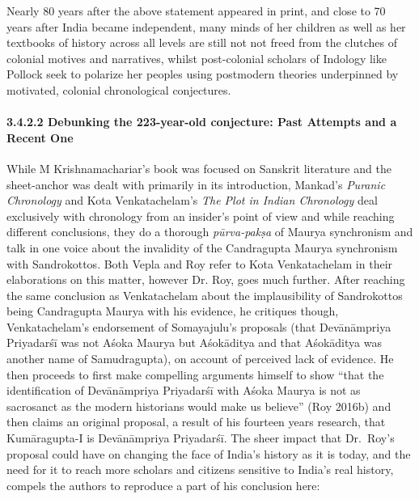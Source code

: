 Nearly 80 years after the above statement appeared in print, and close to 70 years after India became independent, many minds of her children as well as her textbooks of history across all levels are still not not freed from the clutches of colonial motives and narratives, whilst post-colonial scholars of Indology like Pollock seek to polarize her peoples using postmodern theories underpinned by motivated, colonial chronological conjectures.


\paragraph*{3.4.2.2 Debunking the 223-year-old conjecture: \hfill\break Past Attempts and a Recent One}

While M Krishnamachariar’s book was focused on Sanskrit literature and the sheet-anchor was dealt with primarily in its introduction, Mankad’s \textit{Puranic Chronology} and Kota Venkatachelam’s \textit{The Plot in Indian Chronology} deal exclusively with chronology from an insider’s point of view and while reaching different conclusions, they do a thorough \textit{pūrva-pakṣa} of Maurya synchronism and talk in one voice about the invalidity of the Candragupta Maurya synchronism with Sandrokottos. Both Vepla and Roy refer to Kota Venkatachelam in their elaborations on this matter, however Dr. Roy, goes much further. After reaching the same conclusion as Venkatachelam about the implausibility of Sandrokottos being Candragupta Maurya with his evidence, he critiques though, Venkatachelam’s endorsement of Somayajulu’s proposals (that Devānāmpriya Priyadarśī was not Aśoka Maurya but Aśokāditya and that Aśokāditya was another name of Samudragupta), on account of perceived lack of evidence. He then proceeds to first make compelling arguments himself to show “that the identification of Devānāmpriya Priyadarśī with Aśoka Maurya is not as sacrosanct as the modern historians would make us believe” (Roy 2016b) and then claims an original proposal, a result of his fourteen years research, that Kumāragupta-I is Devānāmpriya Priyadarśī. The sheer impact that Dr.~Roy's proposal could have on changing the face of India’s history as it is today, and the need for it to reach more scholars and citizens sensitive to India’s real history, compels the authors to reproduce a part of his conclusion here:

